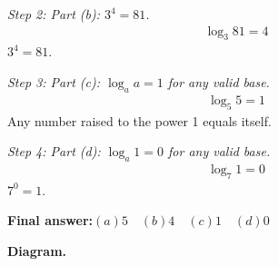 \documentclass[11pt]{article}
\begin{document}
\textit{Step 2: Part (b): \( 3^4 = 81 \).}
\[\begin{gathered}
\log_3 81 = 4
\end{gathered}\]
\( 3^4 = 81 \).

\textit{Step 3: Part (c): \( \log_a a = 1 \) for any valid base.}
\[\begin{gathered}
\log_5 5 = 1
\end{gathered}\]
Any number raised to the power 1 equals itself.

\textit{Step 4: Part (d): \( \log_a 1 = 0 \) for any valid base.}
\[\begin{gathered}
\log_7 1 = 0
\end{gathered}\]
\( 7^0 = 1 \).

\begin{answerbox}
\textbf{Final answer:}\quad \(\displaystyle (a) 5 \quad (b) 4 \quad (c) 1 \quad (d) 0\)
\end{answerbox}
\textbf{Diagram.}
\end{document}
